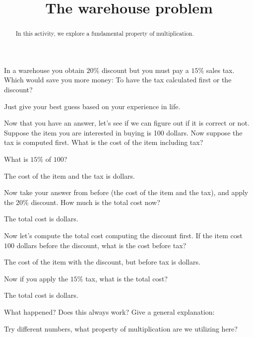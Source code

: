 \documentclass{ximera}
\title{The warehouse problem}
\begin{document}
\begin{abstract}
In this activity, we explore a fundamental property of multiplication. 
\end{abstract}
\maketitle

\begin{question}
In a warehouse you obtain $20\%$ discount but you must pay a $15\%$
sales tax. Which would save you more money: To have the tax calculated
first or the discount? 
\begin{solution}
\begin{free-response}
Just give your best guess based on your experience in life. 
\end{free-response}
\end{solution}
Now that you have an answer, let's see if we can figure out if it is
correct or not. Suppose the item you are interested in buying is 100
dollars. Now suppose the tax is computed first. What is the cost of
the item including tax?
\begin{solution}
\begin{hint}
What is $15\%$ of $100$?  
\end{hint}
The cost of the item and the tax is
 dollars. 
\end{solution}
Now take your answer from before (the cost of the item and the tax),
and apply the $20\%$ discount. How much is the total cost now?
\begin{solution}
The total cost is  dollars. 
\end{solution}
Now let's compute the total cost computing the discount first. If the
item cost $100$ dollars before the discount, what is the cost before tax?
\begin{solution}
The cost of the item with the discount, but before tax is  dollars. 
\end{solution}
Now if you apply the $15\%$ tax, what is the total cost?
\begin{solution}
The total cost is  dollars.
\end{solution} 
What happened? Does this always work? Give a general explanation:
\begin{free-response}
Try different numbers, what property of multiplication are we
utilizing here?
\end{free-response}
\end{question}
\end{document}
